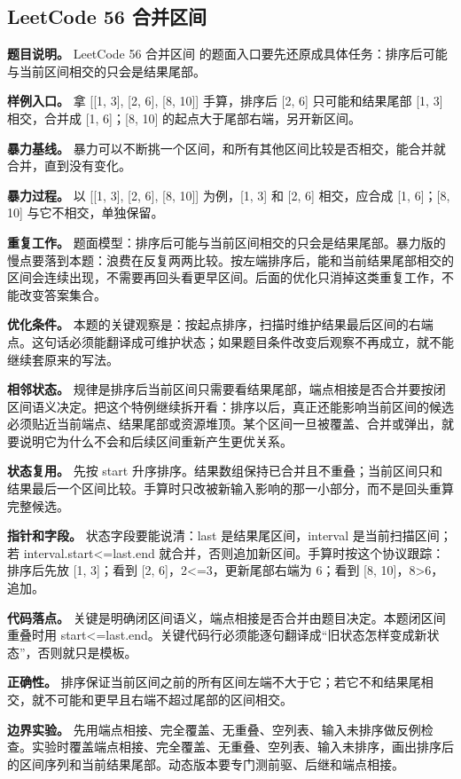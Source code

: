 \subsection{LeetCode 56 合并区间}

\textbf{题目说明。} LeetCode 56 合并区间 的题面入口要先还原成具体任务：排序后可能与当前区间相交的只会是结果尾部。

\textbf{样例入口。} 拿 [[1, 3], [2, 6], [8, 10]] 手算，排序后 [2, 6] 只可能和结果尾部 [1, 3] 相交，合并成 [1, 6]；[8, 10] 的起点大于尾部右端，另开新区间。

\textbf{暴力基线。} 暴力可以不断挑一个区间，和所有其他区间比较是否相交，能合并就合并，直到没有变化。

\textbf{暴力过程。} 以 [[1, 3], [2, 6], [8, 10]] 为例，[1, 3] 和 [2, 6] 相交，应合成 [1, 6]；[8, 10] 与它不相交，单独保留。

\textbf{重复工作。} 题面模型：排序后可能与当前区间相交的只会是结果尾部。暴力版的慢点要落到本题：浪费在反复两两比较。按左端排序后，能和当前结果尾部相交的区间会连续出现，不需要再回头看更早区间。后面的优化只消掉这类重复工作，不能改变答案集合。

\textbf{优化条件。} 本题的关键观察是：按起点排序，扫描时维护结果最后区间的右端点。这句话必须能翻译成可维护状态；如果题目条件改变后观察不再成立，就不能继续套原来的写法。

\textbf{相邻状态。} 规律是排序后当前区间只需要看结果尾部，端点相接是否合并要按闭区间语义决定。把这个特例继续拆开看：排序以后，真正还能影响当前区间的候选必须贴近当前端点、结果尾部或资源堆顶。某个区间一旦被覆盖、合并或弹出，就要说明它为什么不会和后续区间重新产生更优关系。

\textbf{状态复用。} 先按 start 升序排序。结果数组保持已合并且不重叠；当前区间只和结果最后一个区间比较。手算时只改被新输入影响的那一小部分，而不是回头重算完整候选。

\textbf{指针和字段。} 状态字段要能说清：last 是结果尾区间，interval 是当前扫描区间；若 interval.start<=last.end 就合并，否则追加新区间。手算时按这个协议跟踪：排序后先放 [1, 3]；看到 [2, 6]，2<=3，更新尾部右端为 6；看到 [8, 10]，8>6，追加。

\textbf{代码落点。} 关键是明确闭区间语义，端点相接是否合并由题目决定。本题闭区间重叠时用 start<=last.end。关键代码行必须能逐句翻译成“旧状态怎样变成新状态”，否则就只是模板。

\textbf{正确性。} 排序保证当前区间之前的所有区间左端不大于它；若它不和结果尾相交，就不可能和更早且右端不超过尾部的区间相交。

\textbf{边界实验。} 先用端点相接、完全覆盖、无重叠、空列表、输入未排序做反例检查。实验时覆盖端点相接、完全覆盖、无重叠、空列表、输入未排序，画出排序后的区间序列和当前结果尾部。动态版本要专门测前驱、后继和端点相接。

